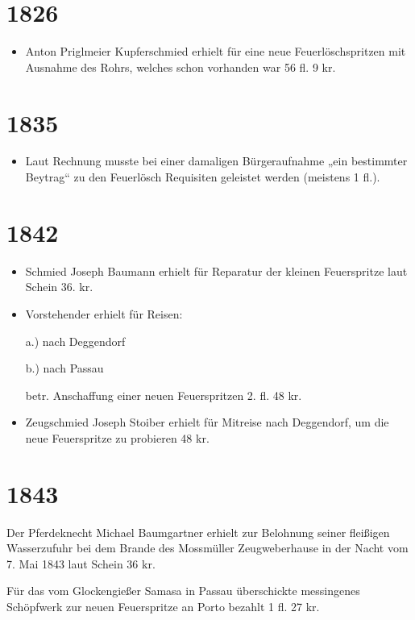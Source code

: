 \documentclass[12pt,a4paper]{book}
\begin{document}
\section*{1826}

\begin{itemize}
\item Anton Priglmeier Kupferschmied erhielt für eine neue Feuerlöschspritzen
mit Ausnahme des Rohrs, welches schon vorhanden war 56 fl. 9 kr.
\end{itemize}

\section*{1835}

\begin{itemize}
\item Laut Rechnung musste bei einer damaligen Bürgeraufnahme „ein bestimmter
Beytrag“ zu den Feuerlösch Requisiten geleistet werden (meistens 1 fl.).
\end{itemize}

\section*{1842}

\begin{itemize}
\item Schmied Joseph Baumann erhielt für Reparatur der kleinen Feuerspritze laut
Schein 36. kr.

\item Vorstehender erhielt für Reisen:

a.) nach Deggendorf

b.) nach Passau

betr. Anschaffung einer neuen Feuerspritzen 2. fl. 48 kr.

\item  Zeugschmied Joseph Stoiber erhielt für Mitreise nach Deggendorf, um die
neue Feuerspritze zu probieren 48 kr.
\end{itemize}

\section*{1843}

Der Pferdeknecht Michael Baumgartner erhielt zur Belohnung seiner fleißigen
Wasserzufuhr bei dem Brande des Mossmüller Zeugweberhause in der Nacht vom 7.
Mai 1843 laut Schein 36 kr.

Für das vom Glockengießer Samasa in Passau überschickte messingenes Schöpfwerk
zur neuen Feuerspritze an Porto bezahlt 1 fl. 27 kr.
\end{document}
